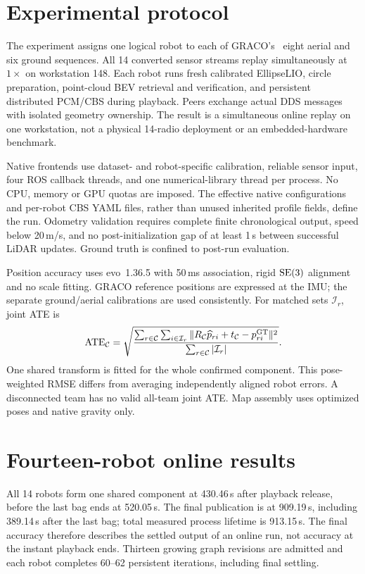 \section{Experimental protocol}
\label{sec:protocol}
The experiment assigns one logical robot to each of GRACO's~\cite{graco} eight aerial and six ground sequences. All 14 converted sensor streams replay simultaneously at $1\times$ on workstation 148. Each robot runs fresh calibrated EllipseLIO, circle preparation, point-cloud BEV retrieval and verification, and persistent distributed PCM/CBS during playback. Peers exchange actual DDS messages with isolated geometry ownership. The result is a simultaneous online replay on one workstation, not a physical 14-radio deployment or an embedded-hardware benchmark.

Native frontends use dataset- and robot-specific calibration, reliable sensor input, four ROS callback threads, and one numerical-library thread per process. No CPU, memory or GPU quotas are imposed. The effective native configurations and per-robot CBS YAML files, rather than unused inherited profile fields, define the run. Odometry validation requires complete finite chronological output, speed below 20\,m/s, and no post-initialization gap of at least 1\,s between successful LiDAR updates. Ground truth is confined to post-run evaluation.

Position accuracy uses evo~1.36.5 with 50\,ms association, rigid $\mathrm{SE}(3)$ alignment and no scale fitting. GRACO reference positions are expressed at the IMU; the separate ground/aerial calibrations are used consistently. For matched sets $\mathcal{I}_r$, joint ATE is
\begin{equation}
 \operatorname{ATE}_{\mathcal{C}}=\sqrt{\frac{\sum_{r\in\mathcal{C}}\sum_{i\in\mathcal{I}_r}
 \|R_{\mathcal{C}}\widehat p_{ri}+t_{\mathcal{C}}-p^{\mathrm{GT}}_{ri}\|^2}
 {\sum_{r\in\mathcal{C}}|\mathcal{I}_r|}}.
\end{equation}
One shared transform is fitted for the whole confirmed component. This pose-weighted RMSE differs from averaging independently aligned robot errors. A disconnected team has no valid all-team joint ATE. Map assembly uses optimized poses and native gravity only.

\section{Fourteen-robot online results}
\label{sec:results}
All 14 robots form one shared component at 430.46\,s after playback release, before the last bag ends at 520.05\,s. The final publication is at 909.19\,s, including 389.14\,s after the last bag; total measured process lifetime is 913.15\,s. The final accuracy therefore describes the settled output of an online run, not accuracy at the instant playback ends. Thirteen growing graph revisions are admitted and each robot completes 60--62 persistent iterations, including final settling.

